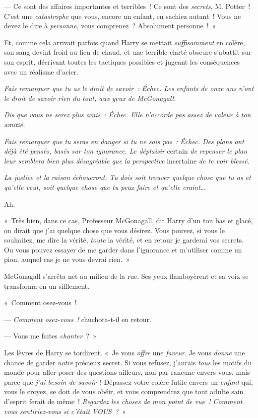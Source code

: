 --- Ce sont des affaires importantes et terribles~! Ce sont des \emph{secrets}, M. Potter~! C'est une \emph{catastrophe} que vous, encore un enfant, en sachiez autant~! Vous ne devez le dire à \emph{personne}, vous comprenez~? Absolument personne~!~»

Et, comme cela arrivait parfois quand Harry se mettait \emph{suffisamment} en colère, son sang devint froid au lieu de chaud, et une terrible clarté obscure s'abattit sur son esprit, décrivant toutes les tactiques possibles et jugeant les conséquences avec un réalisme d'acier.

\emph{Fais remarquer que tu as le droit de savoir~: Échec. Les enfants de onze ans n'ont le droit de savoir rien du tout, aux yeux de McGonagall.}

\emph{Dis que vous ne serez plus amis~: Échec. Elle n'accorde pas assez de valeur à ton amitié.}

\emph{Fais remarquer que tu seras en danger si tu ne sais pas~: Échec. Des plans ont déjà été pensés, basés sur ton ignorance. Le déplaisir} certain \emph{de repenser le plan leur semblera bien plus désagréable que la perspective} incertaine \emph{de te voir blessé.}

\emph{La justice et la raison échoueront. Tu dois soit trouver quelque chose que tu as et qu'elle veut, soit quelque chose que tu peux faire et qu'elle craint…}

Ah.

«~Très bien, dans ce cas, Professeur McGonagall, dit Harry d'un ton bas et glacé, on dirait que j'ai quelque chose que vous désirez. Vous pouvez, si vous le souhaitez, me dire la vérité, \emph{toute} la vérité, et en retour je garderai vos secrets. Ou vous pouvez essayer de me garder dans l'ignorance et m'utiliser comme un pion, auquel cas je ne vous devrai rien.~»

McGonagall s'arrêta net au milieu de la rue. Ses yeux flamboyèrent et sa voix se transforma en un sifflement.

«~Comment osez-vous~!

--- \emph{Comment osez-vous~!} chuchota-t-il en retour.

--- Vous me faites \emph{chanter}~?~»

Les lèvres de Harry se tordirent. «~Je vous \emph{offre} une \emph{faveur}. Je vous \emph{donne} une chance de garder \emph{notre} précieux secret. Si vous refusez, j'aurais \emph{tous} les motifs du monde pour aller poser des questions ailleurs, non par rancune envers vous, mais parce que \emph{j'ai besoin de savoir}~! Dépassez votre colère futile envers un \emph{enfant} qui, vous le croyez, se doit de vous obéir, et vous comprendrez que tout adulte sain d'esprit ferait de même~! \emph{Regardez les choses de mon point de vue~! Comment vous sentiriez-vous si c'était VOUS~?}~»

